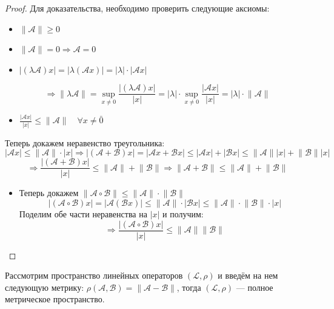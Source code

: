 \documentclass[11pt]{article}
\begin{document}
\begin{proof}
    Для доказательства, необходимо проверить следующие аксиомы: 
    \begin{itemize}
        \item $\lVert \mathcal{A} \rVert \geq 0 $
        \item $ \lVert \mathcal{A} \rVert = 0 \Rightarrow \mathcal{A} = 0 $
        \item $ | (\lambda \mathcal{A}) x | = | \lambda (\mathcal{A}x) | = |\lambda| \cdot |\mathcal{A} x | $
    \end{itemize}
    \[ \Rightarrow \lVert \lambda \mathcal{A} \rVert = \sup_{x\neq 0} \frac{|(\lambda \mathcal{A})x|}{|x|} = |\lambda| \cdot \sup_{x\neq 0} \frac{|\mathcal{A}x|}{|x|} = |\lambda| \cdot \lVert \mathcal{A} \rVert \]    
    \begin{itemize}
        \item $\displaystyle \frac{| \mathcal{A}x|}{|x|} \leq \lVert \mathcal{A} \rVert \quad \forall x \neq \bar{0} $
    \end{itemize}
    Теперь докажем неравенство треугольника:
    \[ |\mathcal{A}x| \leq \lVert \mathcal{A} \rVert \cdot | x | \Rightarrow |(\mathcal{A} + \mathcal{B})x| = |\mathcal{A}x + \mathcal{B}x |  \leq |\mathcal{A}x| + |\mathcal{B}x| \leq \lVert \mathcal{A} \rVert |x| + \lVert \mathcal{B} \rVert |x|  \]   
    \[ \Rightarrow \frac{|(\mathcal{A+B})x|}{|x|} \leq \lVert \mathcal{A} \rVert +  \lVert \mathcal{B} \rVert \Rightarrow \lVert \mathcal{A+B} \rVert \leq \lVert \mathcal{A} \rVert + \lVert \mathcal{B} \rVert  \] 
    \begin{itemize}
        \item Теперь докажем  $\lVert \mathcal{A} \circ  \mathcal{B} \rVert \leq \lVert \mathcal{A}  \rVert \cdot \lVert \mathcal{B} \rVert$
     \[ | (\mathcal{A} \circ \mathcal{B}) x | = |\mathcal{A} (\mathcal{B}x) | \leq \lVert  \mathcal{A} \rVert \cdot | \mathcal{B} x| \leq \lVert \mathcal{A} \rVert \cdot \lVert \mathcal{B} \rVert \cdot |x| \] 
     Поделим обе части неравенства на $|x|$ и получим:  
    \[ \Rightarrow \frac{|(\mathcal{A} \circ \mathcal{B}) x| }{|x|} \leq \lVert \mathcal{A} \rVert \lVert \mathcal{B} \rVert \] 
    \end{itemize}
   
\end{proof}


\begin{statement}
    Рассмотрим пространство линейных операторов $(\mathcal{L}, \rho)$  и введём на нем следующую метрику: $\rho (\mathcal{A}, \mathcal{B}) = \lVert \mathcal{A-B} \rVert $,  тогда $(\mathcal{L}, \rho)$ --- полное метрическое пространство. 
\end{statement}
\end{document}
